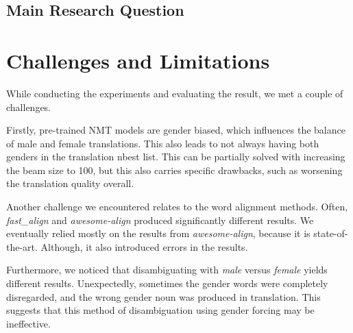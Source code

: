 \subsection{Main Research Question} %
\label{sec:Discussion:Answers:Main}


\section{Challenges and Limitations}
\label{sec:Discussion:Challenges}

While conducting the experiments and evaluating the result, we met a couple of challenges.

Firstly, pre-trained NMT models are gender biased, which influences the balance of male and female translations. This also leads to not always having both genders in the translation nbest list. This can be partially solved with increasing the beam size to 100, but this also carries specific drawbacks, such as worsening the translation quality overall.

Another challenge we encountered relates to the word alignment methods. Often, \textit{fast\_align} and \textit{awesome-align} produced significantly different results. We eventually relied mostly on the results from \textit{awesome-align}, because it is state-of-the-art. Although, it also introduced errors in the results.

Furthermore, we noticed that disambiguating with \textit{male} versus \textit{female} yields different results. Unexpectedly, sometimes the gender words were completely disregarded, and the wrong gender noun was produced in translation. This suggests that this method of disambiguation using gender forcing may be ineffective.


